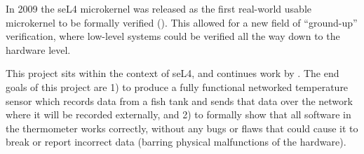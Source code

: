 \documentclass[twoside]{memoir}
\begin{document}
In 2009 the seL4 microkernel was released as the first real-world usable
microkernel to be formally verified (\cite{Klein2014Verification}).
This allowed for a new field of ``ground-up'' verification,
where low-level systems could be verified all the way down to the hardware level.

This project sits within the context of seL4, and
continues work by \cite{kaegi-early}.
The end goals of this project are 1) to produce a fully functional
networked temperature sensor which records data from a fish tank
and sends that data over the network where it will be recorded externally, and 2)
to formally show that all software in the
thermometer works correctly, without any bugs or flaws that could cause
it to break or report incorrect data (barring physical malfunctions of the hardware).
\end{document}
